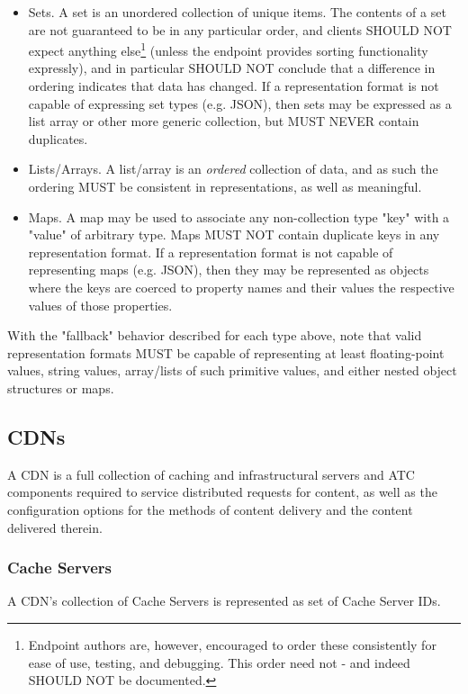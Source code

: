 \begin{itemize}
	\begin{itemize}
		\item Sets. A set is an unordered collection of unique items. The
		contents of a set are not guaranteed to be in any particular order, and
		clients SHOULD NOT expect anything else\footnote{Endpoint authors are,
		however, encouraged to order these consistently for ease of use,
		testing, and debugging. This order need not - and indeed SHOULD NOT be
		documented.} (unless the endpoint provides sorting functionality
		expressly), and in particular SHOULD NOT conclude that a difference in
		ordering indicates that data has changed. If a representation format is
		not capable of expressing set types (e.g. JSON), then sets may be
		expressed as a list array or other more generic collection, but MUST
		NEVER contain duplicates.

		\item Lists/Arrays. A list/array is an \emph{ordered} collection of
		data, and as such the ordering MUST be consistent in representations, as
		well as meaningful.

		\item Maps. A map may be used to associate any non-collection type "key"
		with a "value" of arbitrary type. Maps MUST NOT contain duplicate keys
		in any representation format. If a representation format is not capable
		of representing maps (e.g. JSON), then they may be represented as
		objects where the keys are coerced to property names and their values
		the respective values of those properties.
	\end{itemize}
\end{itemize}

With the "fallback" behavior described for each type above, note that valid
representation formats MUST be capable of representing at least floating-point
values, string values, array/lists of such primitive values, and either nested
object structures or maps.

\subsection{CDNs}
A CDN is a full collection of caching and infrastructural servers and ATC
components required to service distributed requests for content, as well as the
configuration options for the methods of content delivery and the content
delivered therein.

\subsubsection{Cache Servers}
A CDN's collection of Cache Servers is represented as set of Cache Server IDs.

